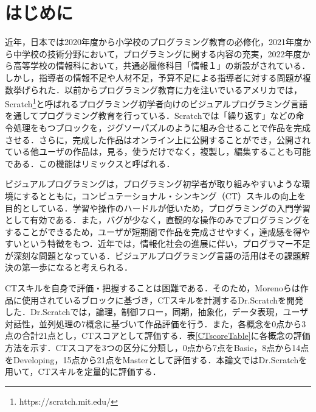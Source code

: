 \documentclass[submit,techrep,noauthor]{ipsj}
\begin{document}
\section{はじめに}

近年，日本では2020年度から小学校のプログラミング教育の必修化，2021年度から中学校の技術分野において，プログラミングに関する内容の充実，2022年度から高等学校の情報科において，共通必履修科目「情報１」の新設がされている\cite{monkashou}．しかし，指導者の情報不足や人材不足，予算不足による指導者に対する問題が複数挙げられた\cite{monkashou2}．以前からプログラミング教育に力を注いでいるアメリカでは，Scratch\footnote{https://scratch.mit.edu/}\cite{resnick2009scratch}と呼ばれるプログラミング初学者向けのビジュアルプログラミング言語を通してプログラミング教育を行っている．Scratchでは「繰り返す」などの命令処理をもつブロックを，ジグソーパズルのように組み合せることで作品を完成させる．さらに，完成した作品はオンライン上に公開することができ，公開されている他ユーザの作品は，見る，使うだけでなく，複製し，編集することも可能である．この機能はリミックスと呼ばれる．

ビジュアルプログラミングは，プログラミング初学者が取り組みやすいような環境にするとともに，コンピュテーショナル・シンキング（CT）\cite{wing2006computational}スキルの向上を目的としている．学習や操作のハードルが低いため，プログラミングの入門学習として有効である．また，バグが少なく，直観的な操作のみでプログラミングをすることができるため，ユーザが短期間で作品を完成させやすく，達成感を得やすいという特徴をもつ．近年では，情報化社会の進展に伴い，プログラマー不足が深刻な問題となっている．ビジュアルプログラミング言語の活用はその課題解決の第一歩になると考えられる．

CTスキルを自身で評価・把握することは困難である．そのため，Morenoらは作品に使用されているブロックに基づき，CTスキルを計測するDr.Scratch\cite{moreno2015dr}を開発した．Dr.Scratchでは，論理，制御フロー，同期，抽象化，データ表現，ユーザ対話性，並列処理の7概念に基づいて作品評価を行う．また，各概念を0点から3点の合計21点とし，CTスコアとして評価する．表\ref{CTscoreTable}に各概念の評価方法を示す．CTスコアを3つの区分に分類し，0点から7点をBasic，8点から14点をDeveloping，15点から21点をMasterとして評価する．本論文ではDr.Scratchを用いて，CTスキルを定量的に評価する．
\end{document}
